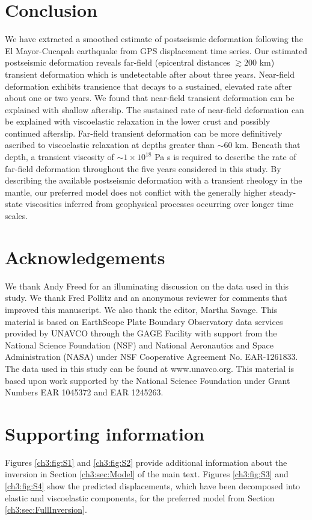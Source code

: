 \section{Conclusion}
We have extracted a smoothed estimate of postseismic deformation
following the El Mayor-Cucapah earthquake from GPS displacement time
series.  Our estimated postseismic deformation reveals far-field
(epicentral distances ${\gtrsim}200$ km) transient deformation which
is undetectable after about three years. Near-field deformation
exhibits transience that decays to a sustained, elevated rate after
about one or two years.  We found that near-field transient
deformation can be explained with shallow afterslip.  The sustained
rate of near-field deformation can be explained with viscoelastic
relaxation in the lower crust and possibly continued afterslip.
Far-field transient deformation can be more definitively ascribed to
viscoelastic relaxation at depths greater than ${\sim}60$ km. Beneath
that depth, a transient viscosity of ${\sim}1\times10^{18}$ Pa s is
required to describe the rate of far-field deformation throughout the
five years considered in this study.  By describing the available
postseismic deformation with a transient rheology in the mantle, our
preferred model does not conflict with the generally higher
steady-state viscosities inferred from geophysical processes occurring
over longer time scales.

\section{Acknowledgements}
We thank Andy Freed for an illuminating discussion on the data used in
this study.  We thank Fred Pollitz and an anonymous reviewer for
comments that improved this manuscript. We also thank the editor,
Martha Savage.  This material is based on EarthScope Plate Boundary
Observatory data services provided by UNAVCO through the GAGE Facility
with support from the National Science Foundation (NSF) and National
Aeronautics and Space Administration (NASA) under NSF Cooperative
Agreement No. EAR-1261833.  The data used in this study can be found
at www.unavco.org. This material is based upon work supported by the
National Science Foundation under Grant Numbers EAR 1045372 and EAR
1245263.

%
%

\section{Supporting information}
Figures \ref{ch3:fig:S1} and \ref{ch3:fig:S2} provide additional
information about the inversion in Section \ref{ch3:sec:Model} of the
main text. Figures \ref{ch3:fig:S3} and \ref{ch3:fig:S4} show the
predicted displacements, which have been decomposed into elastic and
viscoelastic components, for the preferred model from Section
\ref{ch3:sec:FullInversion}.

